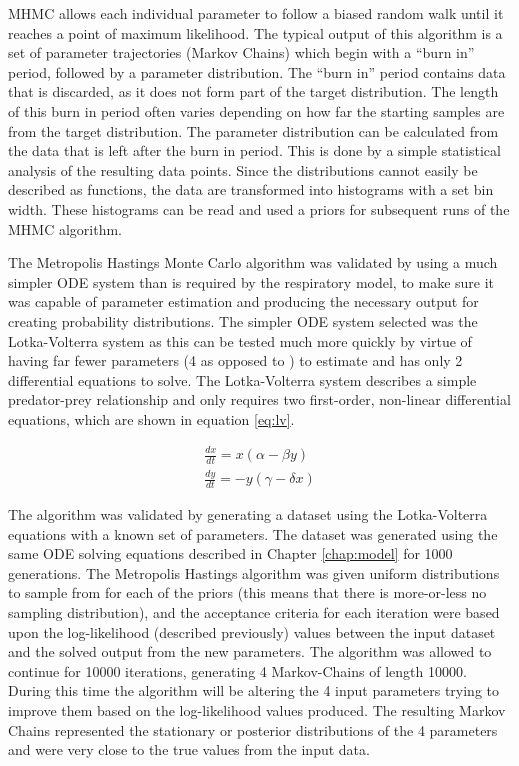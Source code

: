 MHMC allows each individual parameter to follow a biased random walk until it reaches a point of maximum likelihood. The typical output of this algorithm is a set of parameter trajectories (Markov Chains) which begin with a ``burn in'' period, followed by a parameter distribution. The ``burn in'' period contains data that is discarded, as it does not form part of the target distribution. The length of this burn in period often varies depending on how far the starting samples are from the target distribution. The parameter distribution can be calculated from the data that is left after the burn in period. This is done by a simple statistical analysis of the resulting data points. Since the distributions cannot easily be described as functions, the data are transformed into histograms with a set bin width. These histograms can be read and used a priors for subsequent runs of the MHMC algorithm.

The Metropolis Hastings Monte Carlo algorithm was validated by using a much simpler ODE system than is required by the respiratory model, to make sure it was capable of parameter estimation and producing the necessary output for creating probability distributions. The simpler ODE system selected was the Lotka-Volterra system as this can be tested much more quickly by virtue of having far fewer parameters (4 as opposed to ) to estimate and has only 2 differential equations to solve. The Lotka-Volterra system describes a simple predator-prey relationship\cite{Lotka1925,Volterra1931} and only requires two first-order, non-linear differential equations, which are shown in equation \ref{eq:lv}.

\begin{eqnarray}
\frac{dx}{dt} = x (\alpha - \beta y)\nonumber \\
\frac{dy}{dt} = -y (\gamma - \delta x)
\label{eq:lv}
\end{eqnarray}

The algorithm was validated by generating a dataset using the Lotka-Volterra equations with a known set of parameters. The dataset was generated using the same ODE solving equations described in Chapter \ref{chap:model} for 1000 generations. The Metropolis Hastings algorithm was given uniform distributions to sample from for each of the priors (this means that there is more-or-less no sampling distribution), and the acceptance criteria for each iteration were based upon the log-likelihood (described previously) values between the input dataset and the solved output from the new parameters. The algorithm was allowed to continue for 10000 iterations, generating 4 Markov-Chains of length 10000. During this time the algorithm will be altering the 4 input parameters trying to improve them based on the log-likelihood values produced. The resulting Markov Chains represented the stationary or posterior distributions of the 4 parameters and were very close to the true values from the input data.

